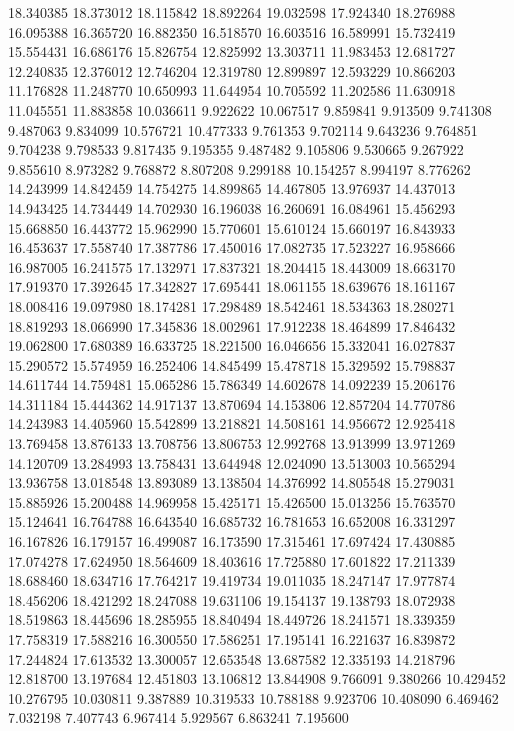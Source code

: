 18.340385
18.373012
18.115842
18.892264
19.032598
17.924340
18.276988
16.095388
16.365720
16.882350
16.518570
16.603516
16.589991
15.732419
15.554431
16.686176
15.826754
12.825992
13.303711
11.983453
12.681727
12.240835
12.376012
12.746204
12.319780
12.899897
12.593229
10.866203
11.176828
11.248770
10.650993
11.644954
10.705592
11.202586
11.630918
11.045551
11.883858
10.036611
9.922622
10.067517
9.859841
9.913509
9.741308
9.487063
9.834099
10.576721
10.477333
9.761353
9.702114
9.643236
9.764851
9.704238
9.798533
9.817435
9.195355
9.487482
9.105806
9.530665
9.267922
9.855610
8.973282
9.768872
8.807208
9.299188
10.154257
8.994197
8.776262
14.243999
14.842459
14.754275
14.899865
14.467805
13.976937
14.437013
14.943425
14.734449
14.702930
16.196038
16.260691
16.084961
15.456293
15.668850
16.443772
15.962990
15.770601
15.610124
15.660197
16.843933
16.453637
17.558740
17.387786
17.450016
17.082735
17.523227
16.958666
16.987005
16.241575
17.132971
17.837321
18.204415
18.443009
18.663170
17.919370
17.392645
17.342827
17.695441
18.061155
18.639676
18.161167
18.008416
19.097980
18.174281
17.298489
18.542461
18.534363
18.280271
18.819293
18.066990
17.345836
18.002961
17.912238
18.464899
17.846432
19.062800
17.680389
16.633725
18.221500
16.046656
15.332041
16.027837
15.290572
15.574959
16.252406
14.845499
15.478718
15.329592
15.798837
14.611744
14.759481
15.065286
15.786349
14.602678
14.092239
15.206176
14.311184
15.444362
14.917137
13.870694
14.153806
12.857204
14.770786
14.243983
14.405960
15.542899
13.218821
14.508161
14.956672
12.925418
13.769458
13.876133
13.708756
13.806753
12.992768
13.913999
13.971269
14.120709
13.284993
13.758431
13.644948
12.024090
13.513003
10.565294
13.936758
13.018548
13.893089
13.138504
14.376992
14.805548
15.279031
15.885926
15.200488
14.969958
15.425171
15.426500
15.013256
15.763570
15.124641
16.764788
16.643540
16.685732
16.781653
16.652008
16.331297
16.167826
16.179157
16.499087
16.173590
17.315461
17.697424
17.430885
17.074278
17.624950
18.564609
18.403616
17.725880
17.601822
17.211339
18.688460
18.634716
17.764217
19.419734
19.011035
18.247147
17.977874
18.456206
18.421292
18.247088
19.631106
19.154137
19.138793
18.072938
18.519863
18.445696
18.285955
18.840494
18.449726
18.241571
18.339359
17.758319
17.588216
16.300550
17.586251
17.195141
16.221637
16.839872
17.244824
17.613532
13.300057
12.653548
13.687582
12.335193
14.218796
12.818700
13.197684
12.451803
13.106812
13.844908
9.766091
9.380266
10.429452
10.276795
10.030811
9.387889
10.319533
10.788188
9.923706
10.408090
6.469462
7.032198
7.407743
6.967414
5.929567
6.863241
7.195600
